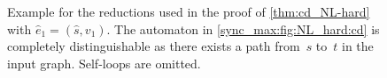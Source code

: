 \begin{figure}[ht]
\begin{minipage}{0.58\textwidth}
		
	\end{minipage}
	\caption[Example for reductions used in the proofs of Thm.~\ref{thm:cd_NL-hard} \& \ref{thm:sync_max_NL-hard}]{Example for the reductions used in the proof of  \cref{thm:cd_NL-hard} with $\hat{e}_1 = (\hat{s}, v_1)$. 
		The automaton in \cref{sync_max:fig:NL_hard:cd}  is completely distinguishable		
		as there exists a path from~$s$ to~$t$ in the input graph. 
		Self-loops are omitted.}
	\label{sync_max:fig:NL_hard}
\end{figure}


